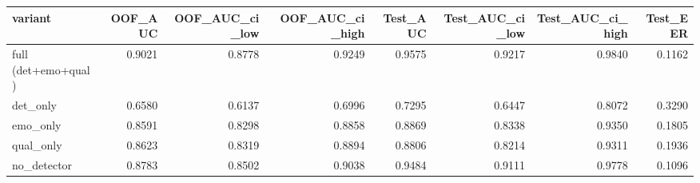 \begin{tabular}{lrrrrrrr}
\toprule
variant & OOF_AUC & OOF_AUC_ci_low & OOF_AUC_ci_high & Test_AUC & Test_AUC_ci_low & Test_AUC_ci_high & Test_EER \\
\midrule
full (det+emo+qual) & 0.9021 & 0.8778 & 0.9249 & 0.9575 & 0.9217 & 0.9840 & 0.1162 \\
det_only & 0.6580 & 0.6137 & 0.6996 & 0.7295 & 0.6447 & 0.8072 & 0.3290 \\
emo_only & 0.8591 & 0.8298 & 0.8858 & 0.8869 & 0.8338 & 0.9350 & 0.1805 \\
qual_only & 0.8623 & 0.8319 & 0.8894 & 0.8806 & 0.8214 & 0.9311 & 0.1936 \\
no_detector & 0.8783 & 0.8502 & 0.9038 & 0.9484 & 0.9111 & 0.9778 & 0.1096 \\
\bottomrule
\end{tabular}
